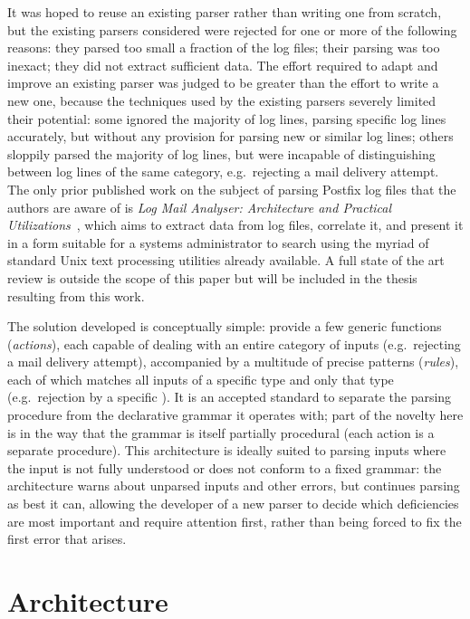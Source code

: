 \documentclass[preprint,draft,numbers,1p]{elsarticle}
\begin{document}
It was hoped to reuse an existing parser rather than writing one from
scratch, but the existing parsers considered were rejected for one or more
of the following reasons: they parsed too small a fraction of the log
files; their parsing was too inexact; they did not extract sufficient data.
The effort required to adapt and improve an existing parser was judged to
be greater than the effort to write a new one, because the techniques used
by the existing parsers severely limited their potential: some ignored the
majority of log lines, parsing specific log lines accurately, but without
any provision for parsing new or similar log lines; others sloppily parsed
the majority of log lines, but were incapable of distinguishing between log
lines of the same category, e.g.\ rejecting a mail delivery attempt.  The
only prior published work on the subject of parsing Postfix log files that
the authors are aware of is \textit{Log Mail Analyser: Architecture and
Practical Utilizations\/}~\cite{log-mail-analyser}, which aims to extract
data from log files, correlate it, and present it in a form suitable for a
systems administrator to search using the myriad of standard Unix text
processing utilities already available.  A full state of the art review is
outside the scope of this paper but will be included in the thesis
resulting from this work.

The solution developed is conceptually simple: provide a few generic
functions (\textit{actions\/}), each capable of dealing with an entire
category of inputs (e.g.\ rejecting a mail delivery attempt), accompanied
by a multitude of precise patterns (\textit{rules\/}), each of which
matches all inputs of a specific type and only that type (e.g.\ rejection
by a specific \DNSBL{}).  It is an accepted standard to separate the
parsing procedure from the declarative grammar it operates with; part of
the novelty here is in the way that the grammar is itself partially
procedural (each action is a separate procedure).  This architecture is
ideally suited to parsing inputs where the input is not fully understood or
does not conform to a fixed grammar: the architecture warns about unparsed
inputs and other errors, but continues parsing as best it can, allowing the
developer of a new parser to decide which deficiencies are most important
and require attention first, rather than being forced to fix the first
error that arises.

\section{Architecture}
\end{document}
